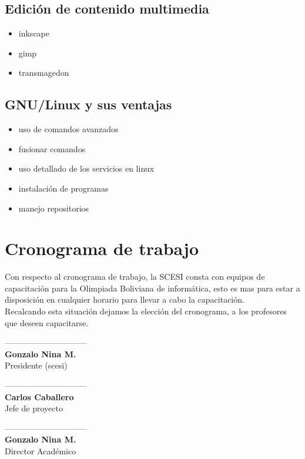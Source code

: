 \documentclass[11pt,letterpaper]{article}
\begin{document}
\subsection{Edición de contenido multimedia}
\begin{itemize}
\item inkscape
\item gimp
\item transmagedon
\end{itemize}

\subsection{GNU/Linux y sus ventajas}
\begin{itemize}
\item uso de comandos avanzados
\item fusionar comandos
\item uso detallado de los servicios en linux
\item instalación de programas
\item manejo repositorios
\end{itemize}

\section{Cronograma de trabajo}
Con respecto al cronograma de trabajo, la SCESI consta con equipos de capacitación para la Olimpiada Boliviana de informática, esto es mas para estar a disposición en cualquier horario para llevar a cabo la capacitación.\\
Recalcando esta situación dejamos la elección del cronograma, a los profesores que deseen capacitarse.



\vspace{7cm}

\begin{minipage}{0.25\textwidth}
\begin{center}
------------------------------\\
{\bf Gonzalo Nina M.}\\
Presidente (scesi)\\
\end{center}
\end{minipage}
\begin{minipage}{0.47\textwidth}
\begin{center}
------------------------------\\
{\bf Carlos Caballero}\\
Jefe de proyecto
\end{center}
\end{minipage}
\begin{minipage}{0.28\textwidth}

\begin{center}
------------------------------\\
{\bf Gonzalo Nina M.}\\
Director Académico\\
\end{center}
\end{minipage}
\end{document}
